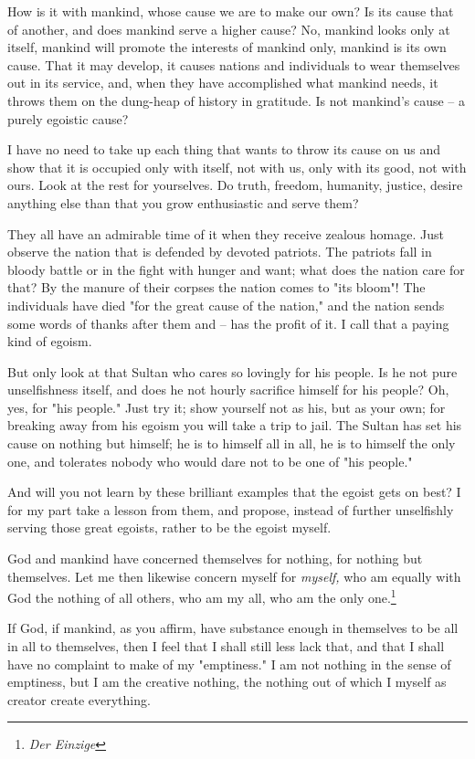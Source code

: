 \documentclass[a4paper]{book}
\begin{document}
How is it with mankind, whose cause we are to make our own? Is its cause that 
of another, and does mankind serve a higher cause? No, mankind looks only at 
itself, mankind will promote the interests of mankind only, mankind is its own 
cause. That it may develop, it causes nations and individuals to wear 
themselves out in its service, and, when they have accomplished what mankind 
needs, it throws them on the dung-heap of history in gratitude. Is not 
mankind's cause -- a purely egoistic cause?

I have no need to take up each thing that wants to throw its cause on us and 
show that it is occupied only with itself, not with us, only with its good, 
not with ours. Look at the rest for yourselves. Do truth, freedom, humanity, 
justice, desire anything else than that you grow enthusiastic and serve them?

They all have an admirable time of it when they receive zealous homage. Just 
observe the nation that is defended by devoted patriots. The patriots fall in 
bloody battle or in the fight with hunger and want; what does the nation care 
for that? By the manure of their corpses the nation comes to "{}its bloom"{}! 
The individuals have died "{}for the great cause of the nation,"{} and the 
nation sends some words of thanks after them and -- has the profit of it. I 
call that a paying kind of egoism.

But only look at that Sultan who cares so lovingly for his people. Is he not 
pure unselfishness itself, and does he not hourly sacrifice himself for his 
people? Oh, yes, for "{}his people."{} Just try it; show yourself not as his, 
but as your own; for breaking away from his egoism you will take a trip to 
jail. The Sultan has set his cause on nothing but himself; he is to himself 
all in all, he is to himself the only one, and tolerates nobody who would dare 
not to be one of "{}his people."{}

And will you not learn by these brilliant examples that the egoist gets on 
best? I for my part take a lesson from them, and propose, instead of further 
unselfishly serving those great egoists, rather to be the egoist myself.

God and mankind have concerned themselves for nothing, for nothing but 
themselves. Let me then likewise concern myself for \textit{myself,} who am 
equally with God the nothing of all others, who am my all, who am the only 
one.\footnote{\textit{Der Einzige}}

If God, if mankind, as you affirm, have substance enough in themselves to be 
all in all to themselves, then I feel that I shall still less lack that, and 
that I shall have no complaint to make of my "{}emptiness."{} I am not nothing 
in the sense of emptiness, but I am the creative nothing, the nothing out of 
which I myself as creator create everything.
\end{document}
